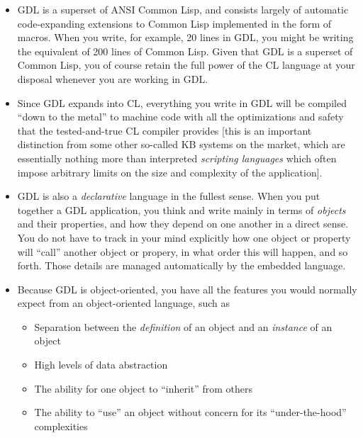 \documentclass [11pt]{book}
\begin{document}
\begin{itemize}

\item GDL is a superset of ANSI Common Lisp, and consists largely of
automatic code-expanding extensions to Common Lisp implemented in the
form of macros. When you write, for example, 20 lines in GDL, you
might be writing the equivalent of 200 lines of Common Lisp. Given
that GDL is a superset of Common Lisp, you of course retain the
full power of the CL language at your disposal whenever you are
working in GDL.
\item Since GDL expands into CL, everything you write in GDL will
be compiled ``down to the metal'' to machine code with all the
optimizations and safety that the tested-and-true CL compiler provides
[this is an important distinction from some other so-called KB systems
on the market, which are essentially nothing more than interpreted \emph{scripting languages} which often impose arbitrary limits on
the size and complexity of the application].

\item GDL is also a \emph{declarative} language in the fullest sense. When you put together a
GDL application, you think and write mainly in terms of \emph{objects} and their properties, and how they depend on one another
in a direct sense. You do not have to track in your mind explicitly
how one object or property will ``call'' another object or propery, in
what order this will happen, and so forth. Those details are managed
automatically by the embedded language.

\item Because GDL is object-oriented, you have all the features you would normally expect
from an object-oriented language, such as 

\begin{itemize}

\item Separation between the \emph{definition} of an object and an \emph{instance} of an object

\item High levels of data abstraction

\item The ability for one object to ``inherit'' from others

\item The ability to ``use'' an object without concern for
	its ``under-the-hood'' complexities


\end{itemize}
\end{itemize}
\end{document}
